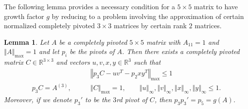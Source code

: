 \documentclass[reqno]{amsart}
\numberwithin{equation}{section}
\newcommand\R{\mathbb{R}}
\newcommand{\norm}[1]{\left\Vert #1 \right\Vert}
\newtheorem{lemma}[theorem]{Lemma}
\begin{document}
The following lemma provides a necessary condition for a $5 \times 5$ matrix to have growth factor $g$ by reducing to a problem involving the approximation of certain normalized completely pivoted $3 \times 3$ matrices by certain rank $2$ matrices.
\begin{lemma}
\label{lemma:reduction_3x3}
    Let $A$ be a completely pivoted $5 \times 5$ matrix with $A_{11} = 1$ and $\norm{A}_{\max} = 1$ and let $p_i$ be the pivots of $A$. Then there exists a completely pivoted matrix $C \in \R^{3 \times 3}$ and vectors $u,v,x,y \in \R^3$ such that 
\begin{align}
\label{eq:low_rank_5x5_pivot} 
    &\norm{p_3 C - uv^T - p_2 xy^T}_{\max} \leq 1\\
    p_3 C = A^{(3)}, \qquad &\norm{C}_{\max} = 1,\qquad \norm{u}_\infty, \norm{v}_\infty, \norm{x}_\infty, \norm{y}_\infty \leq 1 \nonumber.
\end{align}
Moreover, if we denote $p_3'$ to be the $3$rd pivot of $C$, then $p_3 p_3' = p_5 = g(A)$.
\end{lemma}
\end{document}
